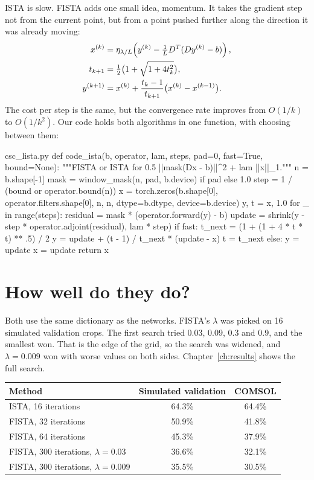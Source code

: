 ISTA is slow. FISTA adds one small idea, momentum. It takes the gradient step not from the
current point, but from a point pushed further along the direction it was already moving:
\begin{align}
x^{(k)} &= \eta_{\lambda/L}\!\left( y^{(k)} - \tfrac1L D^T(Dy^{(k)} - b) \right),\\
t_{k+1} &= \tfrac12\big(1+\sqrt{1+4t_k^2}\big),\\
y^{(k+1)} &= x^{(k)} + \frac{t_k-1}{t_{k+1}}\big(x^{(k)}-x^{(k-1)}\big).
\end{align}
The cost per step is the same, but the convergence rate improves from $O(1/k)$ to $O(1/k^2)$. Our code holds
both algorithms in one function, with  choosing between them:

\begin{code*}{csc_lista.py}
def code_ista(b, operator, lam, steps, pad=0, fast=True, bound=None):
    """FISTA or ISTA for 0.5 ||mask(Dx - b)||^2 + lam ||x||_1."""
    n = b.shape[-1]
    mask = window_mask(n, pad, b.device) if pad else 1.0
    step = 1 / (bound or operator.bound(n))
    x = torch.zeros(b.shape[0], operator.filters.shape[0], n, n, dtype=b.dtype,
                    device=b.device)
    y, t = x, 1.0
    for _ in range(steps):
        residual = mask * (operator.forward(y) - b)
        update = shrink(y - step * operator.adjoint(residual), lam * step)
        if fast:
            t_next = (1 + (1 + 4 * t * t) ** .5) / 2
            y = update + (t - 1) / t_next * (update - x)
            t = t_next
        else:
            y = update
        x = update
    return x
\end{code*}

\section{How well do they do?}

Both use the same dictionary as the networks. FISTA's $\lambda$ was picked on 16 simulated validation crops. The first
search tried 0.03, 0.09, 0.3 and 0.9, and the smallest won. That is the edge of the grid, so the search was widened, and
$\lambda=0.009$ won with worse values on both sides. Chapter~\ref{ch:results} shows the full search.

\begin{center}
\begin{tabular}{lcc}
\toprule
Method & Simulated validation & COMSOL \\
\midrule
ISTA, 16 iterations & 64.3\% & 64.4\% \\
FISTA, 32 iterations & 50.9\% & 41.8\% \\
FISTA, 64 iterations & 45.3\% & 37.9\% \\
FISTA, 300 iterations, $\lambda=0.03$ & 36.6\% & 32.1\% \\
FISTA, 300 iterations, $\lambda=0.009$ & 35.5\% & 30.5\% \\
\bottomrule
\end{tabular}
\end{center}

